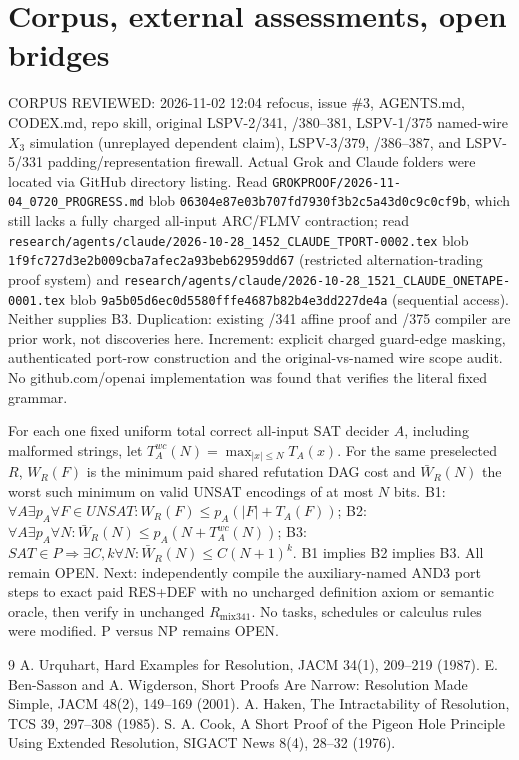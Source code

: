 \documentclass[11pt]{article}
\begin{document}
\section*{Corpus, external assessments, open bridges}
CORPUS REVIEWED: 2026-11-02 12:04 refocus, issue \#3, AGENTS.md, CODEX.md, repo skill, original LSPV-2/341, /380--381, LSPV-1/375 named-wire $X_3$ simulation (unreplayed dependent claim), LSPV-3/379, /386--387, and LSPV-5/331 padding/representation firewall. Actual Grok and Claude folders were located via GitHub directory listing. Read \texttt{GROKPROOF/2026-11-04\_0720\_PROGRESS.md} blob \texttt{06304e87e03b707fd7930f3b2c5a43d0c9c0cf9b}, which still lacks a fully charged all-input ARC/FLMV contraction; read \texttt{research/agents/claude/2026-10-28\_1452\_CLAUDE\_TPORT-0002.tex} blob \texttt{1f9fc727d3e2b009cba7afec2a93beb62959dd67} (restricted alternation-trading proof system) and \texttt{research/agents/claude/2026-10-28\_1521\_CLAUDE\_ONETAPE-0001.tex} blob \texttt{9a5b05d6ec0d5580fffe4687b82b4e3dd227de4a} (sequential access). Neither supplies B3. Duplication: existing /341 affine proof and /375 compiler are prior work, not discoveries here. Increment: explicit charged guard-edge masking, authenticated port-row construction and the original-vs-named wire scope audit. No github.com/openai implementation was found that verifies the literal fixed grammar.

For each one fixed uniform total correct all-input SAT decider $A$, including malformed strings, let $T_A^{wc}(N)=\max_{|x|\le N}T_A(x)$. For the same preselected $R$, $W_R(F)$ is the minimum paid shared refutation DAG cost and $\bar W_R(N)$ the worst such minimum on valid UNSAT encodings of at most $N$ bits. B1: $\forall A\exists p_A\forall F\in UNSAT:W_R(F)\le p_A(|F|+T_A(F))$; B2: $\forall A\exists p_A\forall N:\bar W_R(N)\le p_A(N+T_A^{wc}(N))$; B3: $SAT\in P\Rightarrow\exists C,k\forall N:\bar W_R(N)\le C(N+1)^k$. B1 implies B2 implies B3. All remain OPEN. Next: independently compile the auxiliary-named AND3 port steps to exact paid RES+DEF with no uncharged definition axiom or semantic oracle, then verify in unchanged $R_{\mathrm{mix341}}$. No tasks, schedules or calculus rules were modified. P versus NP remains OPEN.

\begin{thebibliography}{9}
 A. Urquhart, Hard Examples for Resolution, JACM 34(1), 209--219 (1987).
 E. Ben-Sasson and A. Wigderson, Short Proofs Are Narrow: Resolution Made Simple, JACM 48(2), 149--169 (2001).
 A. Haken, The Intractability of Resolution, TCS 39, 297--308 (1985).
 S. A. Cook, A Short Proof of the Pigeon Hole Principle Using Extended Resolution, SIGACT News 8(4), 28--32 (1976).
\end{thebibliography}
\end{document}
